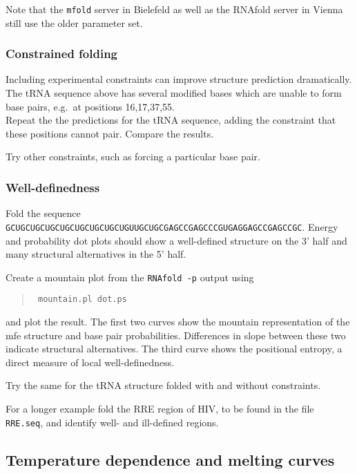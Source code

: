 \documentclass{article}
\begin{document}
Note that the {\tt mfold} server in Bielefeld as well as the RNAfold server
in Vienna still use the older parameter set.

\subsubsection{Constrained folding}

Including experimental constraints can improve structure prediction
dramatically. The tRNA sequence above has several modified bases which are
unable to form base pairs, e.g.\ at positions 16,17,37,55.\\
Repeat the the predictions for the tRNA sequence, adding the constraint
that these positions cannot pair. Compare the results.

Try other constraints, such as forcing a particular base pair.


\subsubsection{Well-definedness}

Fold the sequence\\
{\small\tt GCUGCUGCUGCUGCUGCUGCUGCUGUUGCUGCGAGCCGAGCCCGUGAGGAGCCGAGCCGC}.
Energy and probability dot plots should show a well-defined structure on
the 3' half and many structural alternatives in the 5' half.

Create a mountain plot from the {\tt RNAfold -p} output using
\begin{quote}\tt
mountain.pl dot.ps
\end{quote} and plot the result. The first two curves show the
mountain representation of the mfe structure and base pair probabilities.
Differences in slope between these two indicate structural alternatives.
The third curve shows the positional entropy, a direct measure of local
well-definedness. 

Try the same for the tRNA structure folded with and without constraints.

For a longer example fold the RRE region of HIV, to be found in the file
{\tt RRE.seq}, and identify well- and ill-defined regions.

\subsection{Temperature dependence and melting curves}
\end{document}
